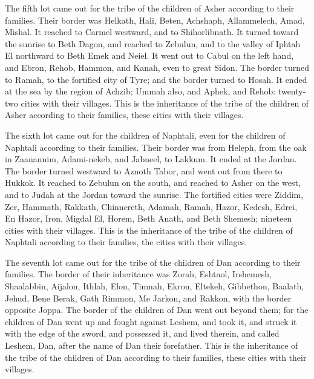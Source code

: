  The fifth lot came out for the tribe of the children of
Asher according to their families.  Their border was
Helkath, Hali, Beten, Achshaph,  Allammelech, Amad,
Mishal. It reached to Carmel westward, and to Shihorlibnath.
 It turned toward the sunrise to Beth Dagon, and reached
to Zebulun, and to the valley of Iphtah El northward to Beth Emek and
Neiel. It went out to Cabul on the left hand,  and Ebron,
Rehob, Hammon, and Kanah, even to great Sidon.  The
border turned to Ramah, to the fortified city of Tyre; and the border
turned to Hosah. It ended at the sea by the region of Achzib;
 Ummah also, and Aphek, and Rehob: twenty-two cities with
their villages.  This is the inheritance of the tribe of
the children of Asher according to their families, these cities with
their villages.

 The sixth lot came out for the children of Naphtali,
even for the children of Naphtali according to their families.
 Their border was from Heleph, from the oak in Zaanannim,
Adami-nekeb, and Jabneel, to Lakkum. It ended at the Jordan.
 The border turned westward to Aznoth Tabor, and went out
from there to Hukkok. It reached to Zebulun on the south, and reached to
Asher on the west, and to Judah at the Jordan toward the sunrise.
 The fortified cities were Ziddim, Zer, Hammath, Rakkath,
Chinnereth,  Adamah, Ramah, Hazor, 
Kedesh, Edrei, En Hazor,  Iron, Migdal El, Horem, Beth
Anath, and Beth Shemesh; nineteen cities with their villages.
 This is the inheritance of the tribe of the children of
Naphtali according to their families, the cities with their villages.

 The seventh lot came out for the tribe of the children
of Dan according to their families.  The border of their
inheritance was Zorah, Eshtaol, Irshemesh,  Shaalabbin,
Aijalon, Ithlah,  Elon, Timnah, Ekron, 
Eltekeh, Gibbethon, Baalath,  Jehud, Bene Berak, Gath
Rimmon,  Me Jarkon, and Rakkon, with the border opposite
Joppa.  The border of the children of Dan went out beyond
them; for the children of Dan went up and fought against Leshem, and
took it, and struck it with the edge of the sword, and possessed it, and
lived therein, and called Leshem, Dan, after the name of Dan their
forefather.  This is the inheritance of the tribe of the
children of Dan according to their families, these cities with their
villages.

